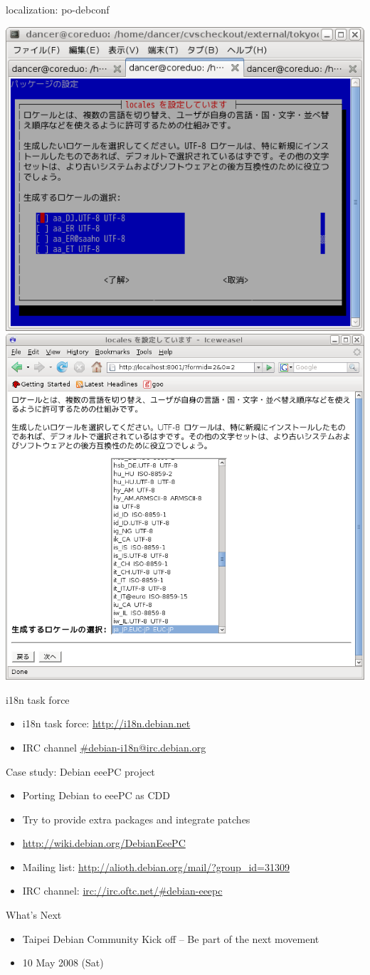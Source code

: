 \documentclass[cjk,dvipdfmx,12pt]{beamer}
\begin{document}
\begin{frame}{localization: po-debconf}

 \includegraphics[width=0.5\hsize]{image200805/debconf-text.png}
 \includegraphics[width=0.5\hsize]{image200805/debconf-locales.png}

\end{frame}

\begin{frame}{i18n task force}
 \begin{itemize}
  \item i18n task force: \url{http://i18n.debian.net}
  \item IRC channel \url{\#debian-i18n@irc.debian.org}
 \end{itemize}
\end{frame}

\begin{frame}{Case study: Debian eeePC project}
 \begin{itemize}
  \item Porting Debian to eeePC as CDD
  \item Try to provide extra packages and integrate patches
  \item \url{http://wiki.debian.org/DebianEeePC}
  \item Mailing list: \url{http://alioth.debian.org/mail/?group_id=31309}
  \item IRC channel: \url{irc://irc.oftc.net/\#debian-eeepc}
 \end{itemize}
\end{frame}

\begin{frame}{What's Next}
 \begin{itemize}
  \item Taipei Debian Community Kick off 
	-- Be part of the next movement
  \item 10 May 2008 (Sat)
 \end{itemize}
\end{frame}
\end{document}
